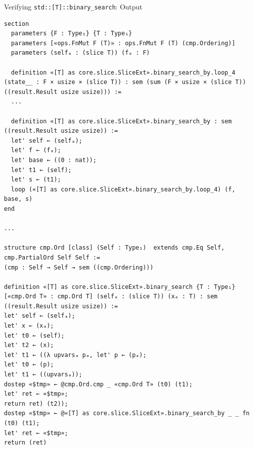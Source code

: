 \documentclass{beamer}
\begin{document}
\begin{frame}[fragile]{Verifying \texttt{std::[T]::binary\_search}: Output}
%
  \begin{verbatim}
section
  parameters {F : Type₁} {T : Type₁}
  parameters [«ops.FnMut F (T)» : ops.FnMut F (T) (cmp.Ordering)]
  parameters (selfₐ : (slice T)) (fₐ : F)

  definition «[T] as core.slice.SliceExt».binary_search_by.loop_4 (state__ : F × usize × (slice T)) : sem (sum (F × usize × (slice T)) ((result.Result usize usize))) :=
  ...

  definition «[T] as core.slice.SliceExt».binary_search_by : sem ((result.Result usize usize)) :=
  let' self ← (selfₐ);
  let' f ← (fₐ);
  let' base ← ((0 : nat));
  let' t1 ← (self);
  let' s ← (t1);
  loop («[T] as core.slice.SliceExt».binary_search_by.loop_4) (f, base, s)
end

...

structure cmp.Ord [class] (Self : Type₁)  extends cmp.Eq Self, cmp.PartialOrd Self Self :=
(cmp : Self → Self → sem ((cmp.Ordering)))

definition «[T] as core.slice.SliceExt».binary_search {T : Type₁} [«cmp.Ord T» : cmp.Ord T] (selfₐ : (slice T)) (xₐ : T) : sem ((result.Result usize usize)) :=
let' self ← (selfₐ);
let' x ← (xₐ);
let' t0 ← (self);
let' t2 ← (x);
let' t1 ← ((λ upvarsₐ pₐ, let' p ← (pₐ);
let' t0 ← (p);
let' t1 ← ((upvarsₐ));
dostep «$tmp» ← @cmp.Ord.cmp _ «cmp.Ord T» (t0) (t1);
let' ret ← «$tmp»;
return ret) (t2));
dostep «$tmp» ← @«[T] as core.slice.SliceExt».binary_search_by _ _ fn (t0) (t1);
let' ret ← «$tmp»;
return (ret)
  \end{verbatim}
\end{frame}
\end{document}
